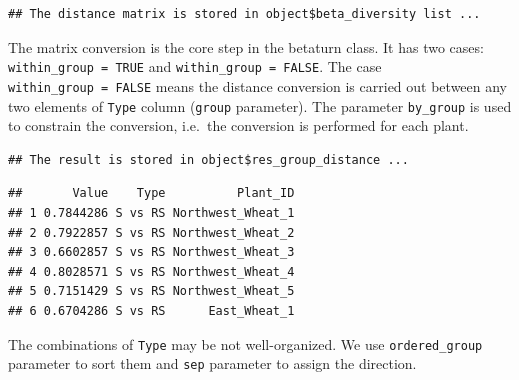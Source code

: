 \documentclass[
]{book}
\newenvironment{Shaded}{\begin{snugshade}}{\end{snugshade}}
\newcommand{\AttributeTok}[1]{\textcolor[rgb]{0.13,0.29,0.53}{#1}}
\newcommand{\ConstantTok}[1]{\textcolor[rgb]{0.56,0.35,0.01}{#1}}
\newcommand{\FunctionTok}[1]{\textcolor[rgb]{0.13,0.29,0.53}{\textbf{#1}}}
\newcommand{\NormalTok}[1]{#1}
\newcommand{\SpecialCharTok}[1]{\textcolor[rgb]{0.81,0.36,0.00}{\textbf{#1}}}
\newcommand{\StringTok}[1]{\textcolor[rgb]{0.31,0.60,0.02}{#1}}
\begin{document}
\begin{verbatim}
## The distance matrix is stored in object$beta_diversity list ...
\end{verbatim}

The matrix conversion is the core step in the betaturn class.
It has two cases: \texttt{within\_group\ =\ TRUE} and \texttt{within\_group\ =\ FALSE}.
The case \texttt{within\_group\ =\ FALSE} means the distance conversion is carried out between any two elements of \texttt{Type} column (\texttt{group} parameter).
The parameter \texttt{by\_group} is used to constrain the conversion, i.e.~the conversion is performed for each plant.

\begin{Shaded}
\end{Shaded}

\begin{verbatim}
## The result is stored in object$res_group_distance ...
\end{verbatim}

\begin{Shaded}
\end{Shaded}

\begin{verbatim}
##       Value    Type          Plant_ID
## 1 0.7844286 S vs RS Northwest_Wheat_1
## 2 0.7922857 S vs RS Northwest_Wheat_2
## 3 0.6602857 S vs RS Northwest_Wheat_3
## 4 0.8028571 S vs RS Northwest_Wheat_4
## 5 0.7151429 S vs RS Northwest_Wheat_5
## 6 0.6704286 S vs RS      East_Wheat_1
\end{verbatim}

The combinations of \texttt{Type} may be not well-organized. We use \texttt{ordered\_group} parameter to sort them and \texttt{sep} parameter to assign the direction.

\begin{Shaded}
\end{Shaded}
\end{document}

